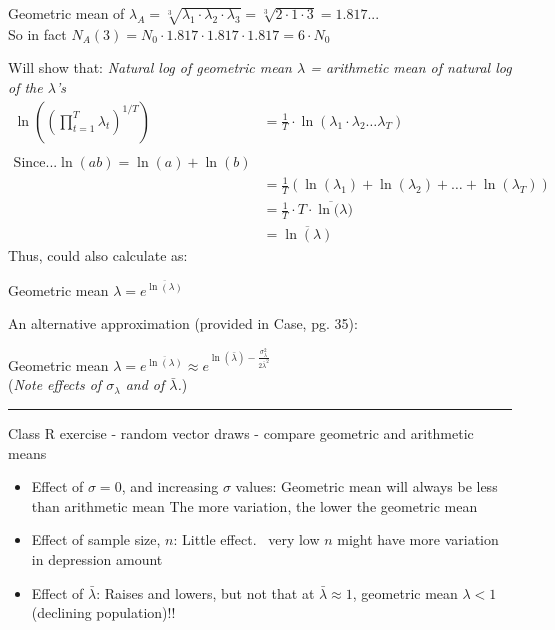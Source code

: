 \documentclass{article}
\newcommand{\note}[1]{\colorbox{gray!20}{#1}}
\begin{document}
\begin{center}
	Geometric mean of $\lambda_A = \sqrt[3]{\lambda_1 \cdot \lambda_2 \cdot \lambda_3} = \sqrt[3]{2 \cdot 1 \cdot 3} = 1.817...$\\
	So in fact $N_A(3) = N_0 \cdot 1.817 \cdot 1.817 \cdot 1.817 = 6 \cdot N_0$
\end{center}
Will show that: 	\emph{Natural log of geometric mean $\lambda$ = arithmetic mean of natural log of the $\lambda$'s}
\begin{align*}
	\ln \left( \left(\prod_{t=1}^T \lambda_t \right)^{1/T}\right) &= \frac{1}{T} \cdot \ln(\lambda_1 \cdot \lambda_2 \dots \lambda_T ) \\\\
	\text{Since...} \ln(ab) = \ln(a)+\ln(b)\\
	&= \frac{1}{T} \left( \ln(\lambda_1) + \ln(\lambda_2) + \dots+ \ln(\lambda_T) \right) \\	
	&=\frac{1}{T} \cdot T \cdot \overline{\ln(\lambda}) \\
	&=\overline{\ln(\lambda)}
\end{align*}
Thus, could also calculate as:
\begin{center}
	Geometric mean $\lambda = e^{\overline{\ln(\lambda)}}$
\end{center}
An alternative approximation (provided in Case, pg. 35):
\begin{center}
	Geometric mean $\lambda = e^{\overline{\ln(\lambda)}} \approx e^{\ln(\bar{\lambda})-\frac{\sigma_\lambda^2}{2\bar{\lambda}^2}}$\\
	(\emph{Note effects of $\sigma_{\lambda}$ and of $\bar{\lambda}$.})
\end{center}
\rule[0.5ex]{\linewidth}{1pt}
\note{Class R exercise} - random vector draws - compare geometric and arithmetic means 
\begin{itemize}
	\item Effect of $\sigma = 0$, and increasing $\sigma$ values:
		\subitem	Geometric mean will always be less than arithmetic mean 
		\subitem	The more variation, the lower the geometric mean 
	\item	Effect of sample size, $n$:
		 \subitem	Little effect.  very low $n$ might have more variation in depression amount 
	\item	Effect of $\bar{\lambda}$:
		\subitem Raises and lowers, but not that at $\bar{\lambda}\approx 1$, geometric mean $\lambda < 1$  (declining population)!!
\end{itemize}
\end{document}
